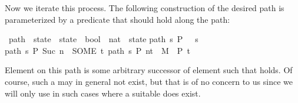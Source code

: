 \begin{isabellebody}
\begin{isamarkuptext}
Now we iterate this process. The following construction of the desired
path is parameterized by a predicate  that should hold along the path:%
\end{isamarkuptext}%
\ path\ {\isacharcolon}{\isacharcolon}\ {\isachardoublequote}state\ {\isasymRightarrow}\ {\isacharparenleft}state\ {\isasymRightarrow}\ bool{\isacharparenright}\ {\isasymRightarrow}\ {\isacharparenleft}nat\ {\isasymRightarrow}\ state{\isacharparenright}{\isachardoublequote}\isanewline
{}\isanewline
{\isachardoublequote}path\ s\ P\ \ {\isacharequal}\ s{\isachardoublequote}\isanewline
{\isachardoublequote}path\ s\ P\ {\isacharparenleft}Suc\ n{\isacharparenright}\ {\isacharequal}\ {\isacharparenleft}SOME\ t{\isachardot}\ {\isacharparenleft}path\ s\ P\ n{\isacharcomma}t{\isacharparenright}\ {\isasymin}\ M\ {\isasymand}\ P\ t{\isacharparenright}{\isachardoublequote}%
\begin{isamarkuptext}%
\noindent
Element  on this path is some arbitrary successor
 of element  such that  holds.  Of
course, such a  may in general not exist, but that is of no
concern to us since we will only use  in such cases where a
suitable  does exist.


\end{isamarkuptext}
\end{isabellebody}
